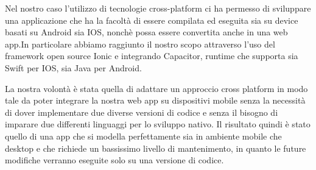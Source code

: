 Nel nostro caso l'utilizzo di tecnologie cross-platform ci ha permesso di sviluppare una applicazione che ha la facoltà di essere compilata ed eseguita sia su device basati su Android sia IOS, nonchè possa essere convertita anche in una web app.In particolare abbiamo raggiunto il nostro scopo attraverso l'uso del framework open source Ionic e integrando Capacitor, runtime che supporta sia Swift per IOS, sia Java per Android. 

La nostra volontà è stata quella di adattare un approccio cross platform in modo tale da poter integrare la nostra web app su dispositivi mobile senza la necessità di dover implementare due diverse versioni di codice e senza il bisogno di imparare due differenti linguaggi per lo sviluppo nativo. Il risultato quindi è stato quello di una app che si modella perfettamente sia in ambiente mobile che desktop e che richiede un bassissimo livello di mantenimento, in quanto le future modifiche verranno eseguite solo su una versione di codice.

